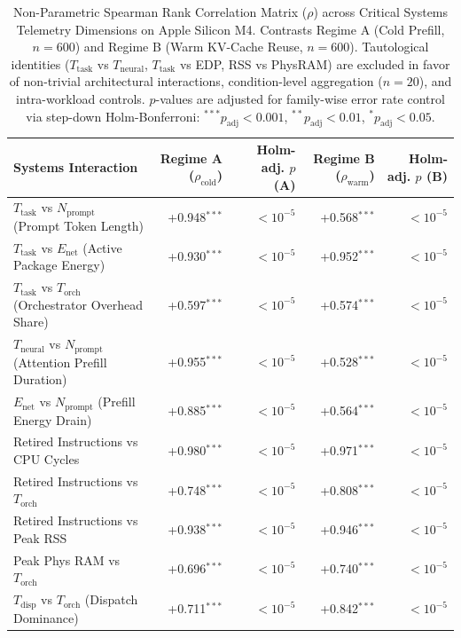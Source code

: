 \begin{table}[t]
\centering
\caption{Non-Parametric Spearman Rank Correlation Matrix ($\rho$) across Critical Systems Telemetry Dimensions on Apple Silicon M4. Contrasts Regime A (Cold Prefill, $n=600$) and Regime B (Warm KV-Cache Reuse, $n=600$). Tautological identities ($T_{\text{task}}$ vs $T_{\text{neural}}$, $T_{\text{task}}$ vs EDP, RSS vs PhysRAM) are excluded in favor of non-trivial architectural interactions, condition-level aggregation ($n=20$), and intra-workload controls. $p$-values are adjusted for family-wise error rate control via step-down Holm-Bonferroni: $^{***}p_{\text{adj}} < 0.001$, $^{**}p_{\text{adj}} < 0.01$, $^{*}p_{\text{adj}} < 0.05$.}
\label{tab:spearman_correlation}
\small
\begin{tabular}{l r r r r}
\hline
\textbf{Systems Interaction} & \textbf{Regime A ($\rho_{\text{cold}}$)} & \textbf{Holm-adj. $p$ (A)} & \textbf{Regime B ($\rho_{\text{warm}}$)} & \textbf{Holm-adj. $p$ (B)} \\
\hline
$T_{\text{task}}$ vs $N_{\text{prompt}}$ (Prompt Token Length) & +0.948$^{***}$ & $< 10^{-5}$ & +0.568$^{***}$ & $< 10^{-5}$ \\
$T_{\text{task}}$ vs $E_{\text{net}}$ (Active Package Energy) & +0.930$^{***}$ & $< 10^{-5}$ & +0.952$^{***}$ & $< 10^{-5}$ \\
$T_{\text{task}}$ vs $T_{\text{orch}}$ (Orchestrator Overhead Share) & +0.597$^{***}$ & $< 10^{-5}$ & +0.574$^{***}$ & $< 10^{-5}$ \\
$T_{\text{neural}}$ vs $N_{\text{prompt}}$ (Attention Prefill Duration) & +0.955$^{***}$ & $< 10^{-5}$ & +0.528$^{***}$ & $< 10^{-5}$ \\
$E_{\text{net}}$ vs $N_{\text{prompt}}$ (Prefill Energy Drain) & +0.885$^{***}$ & $< 10^{-5}$ & +0.564$^{***}$ & $< 10^{-5}$ \\
Retired Instructions vs CPU Cycles & +0.980$^{***}$ & $< 10^{-5}$ & +0.971$^{***}$ & $< 10^{-5}$ \\
Retired Instructions vs $T_{\text{orch}}$ & +0.748$^{***}$ & $< 10^{-5}$ & +0.808$^{***}$ & $< 10^{-5}$ \\
Retired Instructions vs Peak RSS & +0.938$^{***}$ & $< 10^{-5}$ & +0.946$^{***}$ & $< 10^{-5}$ \\
Peak Phys RAM vs $T_{\text{orch}}$ & +0.696$^{***}$ & $< 10^{-5}$ & +0.740$^{***}$ & $< 10^{-5}$ \\
$T_{\text{disp}}$ vs $T_{\text{orch}}$ (Dispatch Dominance) & +0.711$^{***}$ & $< 10^{-5}$ & +0.842$^{***}$ & $< 10^{-5}$ \\

\end{tabular}
\end{table}
